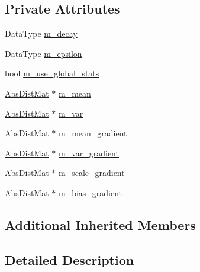 \subsection*{Private Attributes}
\begin{DoxyCompactItemize}
\item 
Data\+Type \hyperlink{classlbann_1_1batch__normalization_aa2ee72d5efbf47c74796510ee61dbb14}{m\+\_\+decay}
\item 
Data\+Type \hyperlink{classlbann_1_1batch__normalization_ab82e74f905b7a117d9940f8542451e37}{m\+\_\+epsilon}
\item 
bool \hyperlink{classlbann_1_1batch__normalization_a0a33289150c01899f4b7ef2980771899}{m\+\_\+use\+\_\+global\+\_\+stats}
\item 
\hyperlink{base_8hpp_a9a697a504ae84010e7439ffec862b470}{Abs\+Dist\+Mat} $\ast$ \hyperlink{classlbann_1_1batch__normalization_a7c0db2315a4c5bb662da7a740ae76e24}{m\+\_\+mean}
\item 
\hyperlink{base_8hpp_a9a697a504ae84010e7439ffec862b470}{Abs\+Dist\+Mat} $\ast$ \hyperlink{classlbann_1_1batch__normalization_aba533149e4179378ab23443b0a2a7dc6}{m\+\_\+var}
\item 
\hyperlink{base_8hpp_a9a697a504ae84010e7439ffec862b470}{Abs\+Dist\+Mat} $\ast$ \hyperlink{classlbann_1_1batch__normalization_aa4677c2f7d5ea27c53bf0f61f280a2a3}{m\+\_\+mean\+\_\+gradient}
\item 
\hyperlink{base_8hpp_a9a697a504ae84010e7439ffec862b470}{Abs\+Dist\+Mat} $\ast$ \hyperlink{classlbann_1_1batch__normalization_aa2d2050a265eed854aa8950cd1461af9}{m\+\_\+var\+\_\+gradient}
\item 
\hyperlink{base_8hpp_a9a697a504ae84010e7439ffec862b470}{Abs\+Dist\+Mat} $\ast$ \hyperlink{classlbann_1_1batch__normalization_a66364e1b0c9afb40a4c03ee1869d264c}{m\+\_\+scale\+\_\+gradient}
\item 
\hyperlink{base_8hpp_a9a697a504ae84010e7439ffec862b470}{Abs\+Dist\+Mat} $\ast$ \hyperlink{classlbann_1_1batch__normalization_aa0f1e9a9f48f67544618e239167494bb}{m\+\_\+bias\+\_\+gradient}
\end{DoxyCompactItemize}
\subsection*{Additional Inherited Members}


\subsection{Detailed Description}
